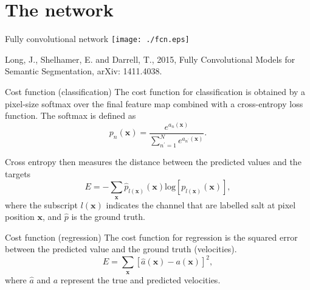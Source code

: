 \documentclass[aspectratio=169]{beamer}
\begin{document}
\section{The network}
\begin{frame}{Fully convolutional network}
    \center
    \texttt{[image: ./fcn.eps]}

\tiny{Long, J., Shelhamer, E. and Darrell, T., 2015, Fully Convolutional Models for Semantic Segmentation, arXiv: 1411.4038.}
\end{frame}
\begin{frame}{Cost function (classification)}
\noindent The cost function for classification is obtained by a pixel-size softmax over the final feature map combined with a cross-entropy loss function. The softmax is defined as
\begin{equation}
p_n(\boldsymbol{x})=\frac{e^{{a_n(\boldsymbol{x})}}}{\sum_{n^\prime=1}^{N}e^{a_{n^\prime}(\boldsymbol{x})}}.
\label{eqn:softmax}
\end{equation}

\noindent Cross entropy then measures the distance between the predicted values and the targets
\begin{equation}
E=-\sum_{\boldsymbol{x}}
        \hat{p}_{l(\boldsymbol{x})}(\boldsymbol{x})
        \mathrm{log}[
        p_{l(\boldsymbol{x})}(\boldsymbol{x})
        ],
\label{eqn:crossentropy}
\end{equation}
where the subscript $l(\boldsymbol{x})$ indicates the channel that are labelled salt at pixel position $\boldsymbol{x}$, and $\hat{p}$ is the ground truth.

\end{frame}
\begin{frame}{Cost function (regression)}
\noindent The cost function for regression is the squared error between the predicted value and the ground truth (velocities). 
\begin{equation}
E=\sum_{\boldsymbol{x}}
        [\hat{a}(\boldsymbol{x})-
        a(\boldsymbol{x})]^2
        ,
\label{eqn:crossentropy}
\end{equation}
where $\hat{a}$ and $a$ represent the true and predicted velocities.

\end{frame}
\end{document}
